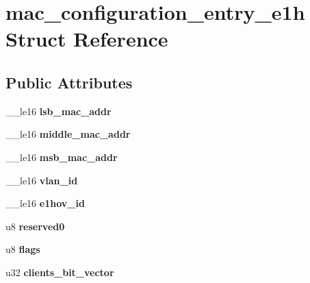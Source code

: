 \hypertarget{structmac__configuration__entry__e1h}{
\section{mac\_\-configuration\_\-entry\_\-e1h Struct Reference}
\label{structmac__configuration__entry__e1h}
}
\subsection*{Public Attributes}
\begin{DoxyCompactItemize}
\item 
\hypertarget{structmac__configuration__entry__e1h_abb1e25fd7c728a4ac996f862a6f574b3}{
\_\-\_\-le16 {\bfseries lsb\_\-mac\_\-addr}}
\label{structmac__configuration__entry__e1h_abb1e25fd7c728a4ac996f862a6f574b3}

\item 
\hypertarget{structmac__configuration__entry__e1h_a4c5bb6be59bd159c6be943b9b991ac57}{
\_\-\_\-le16 {\bfseries middle\_\-mac\_\-addr}}
\label{structmac__configuration__entry__e1h_a4c5bb6be59bd159c6be943b9b991ac57}

\item 
\hypertarget{structmac__configuration__entry__e1h_a9910bbdb4d4ee2abb0ff7aef65aaa383}{
\_\-\_\-le16 {\bfseries msb\_\-mac\_\-addr}}
\label{structmac__configuration__entry__e1h_a9910bbdb4d4ee2abb0ff7aef65aaa383}

\item 
\hypertarget{structmac__configuration__entry__e1h_ae57315aa9f27d351c7e976b03e355c3a}{
\_\-\_\-le16 {\bfseries vlan\_\-id}}
\label{structmac__configuration__entry__e1h_ae57315aa9f27d351c7e976b03e355c3a}

\item 
\hypertarget{structmac__configuration__entry__e1h_afceaf4312069a4adba22fc4e2e9b435c}{
\_\-\_\-le16 {\bfseries e1hov\_\-id}}
\label{structmac__configuration__entry__e1h_afceaf4312069a4adba22fc4e2e9b435c}

\item 
\hypertarget{structmac__configuration__entry__e1h_a4bbdd2d09c68d10f84755b43bfa75795}{
u8 {\bfseries reserved0}}
\label{structmac__configuration__entry__e1h_a4bbdd2d09c68d10f84755b43bfa75795}

\item 
\hypertarget{structmac__configuration__entry__e1h_a846ae64340735b185b67dc891b9e40ea}{
u8 {\bfseries flags}}
\label{structmac__configuration__entry__e1h_a846ae64340735b185b67dc891b9e40ea}

\item 
\hypertarget{structmac__configuration__entry__e1h_ab65cf58b02772a4d44b3d40a5d06b998}{
u32 {\bfseries clients\_\-bit\_\-vector}}
\label{structmac__configuration__entry__e1h_ab65cf58b02772a4d44b3d40a5d06b998}

\end{DoxyCompactItemize}


